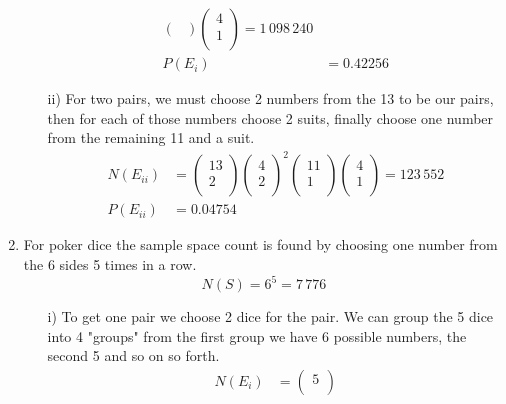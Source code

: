 \documentclass[12pt]{article}
\begin{document}
\begin{enumerate}[label=\alph*)]
\begin{enumerate}
\begin{align*}
\begin{pmatrix}
           \end{pmatrix}
           \begin{pmatrix}
            4 \\
            1 \\
       \end{pmatrix} = 1 \, 098 \, 240 \\
       P(E_i) &= 0.42256
    \end{align*}
    \item[ii)] For two pairs, we must choose 2 numbers from the 13 to be our pairs, then for each of those numbers choose 2 suits, finally choose one number from the remaining 11 and a suit. 
    \begin{align*}
        N(E_{i i}) &= \begin{pmatrix}
            13 \\
           2\\
       \end{pmatrix} 
       \begin{pmatrix}
            4 \\
            2 \\
       \end{pmatrix} ^{2} 
       \begin{pmatrix}
           11 \\
            1 \\
       \end{pmatrix}
       \begin{pmatrix}
            4 \\
            1 \\
       \end{pmatrix}  = 123 \, 552 \\
       P(E_{i i}) &= 0.04754
    \end{align*}
    \end{enumerate}
    \item For poker dice the sample space count is found by choosing one number from the 6 sides 5 times in a row. 
    \[
        N(S) = 6^{5} = 7\,776 
    \]
    \begin{enumerate}
        \item [i)] To get one pair we choose 2 dice for the pair. We can group the 5 dice into 4 "groups" 
        from the first group we have 6 possible numbers, the second 5 and so on so forth. 
        \begin{align*}
            N(E_i) &= \begin{pmatrix}
                 5 \\

\end{pmatrix}
\end{align*}
\end{enumerate}
\end{enumerate}
\end{document}

